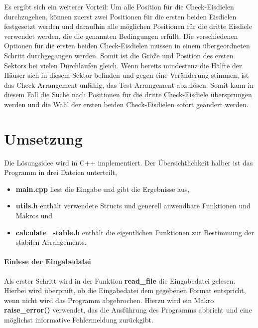 \documentclass[a4paper,10pt,ngerman]{scrartcl}
\begin{document}
\medskip
Es ergibt sich ein weiterer Vorteil:
Um alle Position für die Check-Eisdielen durchzugehen, können zuerst zwei Positionen für die ersten beiden Eisdielen festgesetzt werden und daraufhin alle möglichen Positionen für die dritte Eisdiele verwendet werden, die die genannten Bedingungen erfüllt.
Die verschiedenen Optionen für die ersten beiden Check-Eisdielen müssen in einem übergeordneten Schritt durchgegangen werden.
Somit ist die Größe und Position des ersten Sektors bei vielen Durchläufen gleich.
Wenn bereits mindestenz die Hälfte der Häuser sich in diesem Sektor befinden und gegen eine Veränderung stimmen, ist das Check-Arrangement unfähig, das Test-Arrangement abzulösen.
Somit kann in diesem Fall die Suche nach Positionen für die dritte Check-Eisdiele übersprungen werden und die Wahl der ersten beiden Check-Eisdielen sofort geändert werden.

\section{Umsetzung}
Die Lösungsidee wird in C++ implementiert.
Der Übersichtlichkeit halber ist das Programm in drei Dateien unterteilt,
\begin{itemize}
    \item \textbf{main.cpp} liest die Eingabe und gibt die Ergebnisse aus,
    \item \textbf{utils.h} enthält verwendete Structs und generell anwendbare Funktionen und Makros und
    \item \textbf{calculate\_stable.h} enthält die eigentlichen Funktionen zur Bestimmung der stabilen Arrangements.
\end{itemize}

\paragraph{Einlese der Eingabedatei}
Als erster Schritt wird in der Funktion \textbf{read\_file} die Eingabedatei gelesen.
Hierbei wird überprüft, ob die Eingabedatei dem gegebenen Format entspricht, wenn nicht wird das Programm abgebrochen.
Hierzu wird ein Makro \textbf{raise\_error()} verwendet, das die Ausführung des Programms abbricht und eine möglichst informative Fehlermeldung zurückgibt.
\end{document}
